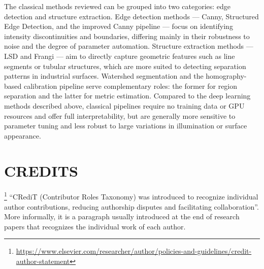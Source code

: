 \documentclass[11pt]{article}
\begin{document}
The classical methods reviewed can be grouped into two categories: edge detection 
and structure extraction. Edge detection methods --- Canny, Structured Edge 
Detection, and the improved Canny pipeline --- focus on identifying intensity 
discontinuities and boundaries, differing mainly in their robustness to noise and 
the degree of parameter automation. Structure extraction methods --- LSD and Frangi 
--- aim to directly capture geometric features such as line segments or tubular 
structures, which are more suited to detecting separation patterns in industrial 
surfaces. Watershed segmentation and the homography-based calibration pipeline 
serve complementary roles: the former for region separation and the latter for 
metric estimation. Compared to the deep learning methods described above, classical 
pipelines require no training data or GPU resources and offer full interpretability, 
but are generally more sensitive to parameter tuning and less robust to large 
variations in illumination or surface appearance.\\
\section{CREDITS}
\label{sec:credits}

\footnote{\url{https://www.elsevier.com/researcher/author/policies-and-guidelines/credit-author-statement}} ``CRediT (Contributor Roles Taxonomy) was introduced to recognize individual author contributions, reducing authorship disputes and facilitating collaboration''. More informally, it is a paragraph usually introduced at the end of research papers that recognizes the individual work of each author.
\end{document}
